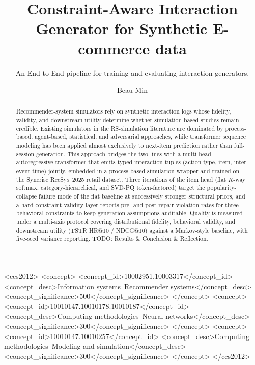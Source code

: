 \documentclass[sigconf,nonacm]{acmart}
\begin{document}
\title{Constraint-Aware Interaction Generator for Synthetic E-commerce data}
\subtitle{An End-to-End pipeline for training and evaluating interaction generators.}

\author{Beau Min}

\renewcommand{\shortauthors}{Min}

\begin{abstract}
Recommender-system simulators rely on synthetic interaction logs whose
fidelity, validity, and downstream utility determine whether
simulation-based studies remain credible. Existing simulators in the
RS-simulation literature are dominated by process-based, agent-based,
statistical, and adversarial approaches, while transformer sequence
modeling has been applied almost exclusively to next-item prediction
rather than full-session generation. This approach bridges the two lines
with a multi-head autoregressive transformer that emits typed
interaction tuples (action type, item, inter-event time) jointly,
embedded in a process-based simulation wrapper and trained on the
Synerise RecSys~2025 retail dataset. Three iterations of the item head
(flat $K$-way softmax, category-hierarchical, and SVD-PQ
token-factored) target the popularity-collapse failure mode of the
flat baseline at successively stronger structural priors, and a
hard-constraint validity layer reports pre- and post-repair violation
rates for three behavioral constraints to keep generation assumptions
auditable. Quality is measured under a multi-axis protocol covering
distributional fidelity, behavioral validity, and downstream utility
(TSTR HR@10 / NDCG@10) against a Markov-style baseline, with five-seed
variance reporting. TODO: Results & Conclusion & Reflection.
\end{abstract}

\begin{CCSXML}
<ccs2012>
 <concept>
  <concept_id>10002951.10003317</concept_id>
  <concept_desc>Information systems~Recommender systems</concept_desc>
  <concept_significance>500</concept_significance>
 </concept>
 <concept>
  <concept_id>10010147.10010178.10010187</concept_id>
  <concept_desc>Computing methodologies~Neural networks</concept_desc>
  <concept_significance>300</concept_significance>
 </concept>
 <concept>
  <concept_id>10010147.10010257</concept_id>
  <concept_desc>Computing methodologies~Modeling and simulation</concept_desc>
  <concept_significance>300</concept_significance>
 </concept>
</ccs2012>
\end{CCSXML}
\end{document}
